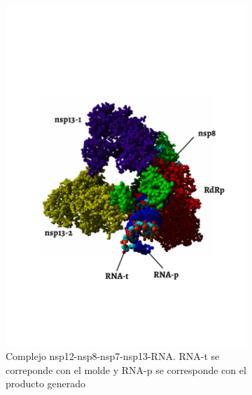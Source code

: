 \documentclass[a4paper,11pt]{report}
\begin{document}
\begin{figure}[h!]
	\centering
	\begin{subfigure}[h]{0.45\textwidth}
		\includegraphics[width=1.2\linewidth]{Figuras/Figura8}
		\caption{Complejo nsp12-nsp8-nsp7-nsp13-RNA. RNA-t se correponde con el molde y RNA-p se corresponde con el producto generado}		
    \end{subfigure}
    \begin{subfigure}[h]{0.45\textwidth}

\end{subfigure}
\end{figure}
\end{document}
